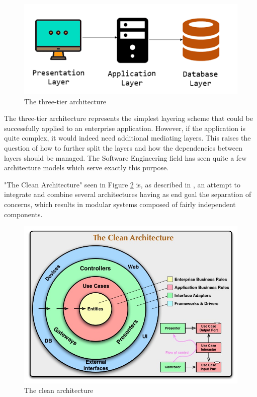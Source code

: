 \begin{figure}[H]
  \centering
  \includegraphics[width=5in]{images/threeTierArchitecture}
  \caption{The three-tier architecture}
  \label{threeTierArchitecture}
\end{figure}

The three-tier architecture represents the simplest layering scheme that could be successfully applied to an enterprise application. However, if the application is quite complex, it would indeed need additional mediating layers. This raises the question of how to further split the layers and how the dependencies between layers should be managed. The Software Engineering field has seen quite a few architecture models which serve exactly this purpose.

"The Clean Architecture" seen in Figure \ref{cleanArchitectureImg} is, as described in \cite{cleanArchitecture}, an attempt to integrate and combine several architectures having as end goal the separation of concerns, which results in modular systems composed of fairly independent components.

\begin{figure}[H]
  \centering
  \includegraphics[width=6in]{images/cleanArchitecture}
  \caption{The clean architecture \cite{cleanArchitecture}}
  \label{cleanArchitectureImg}
\end{figure}

